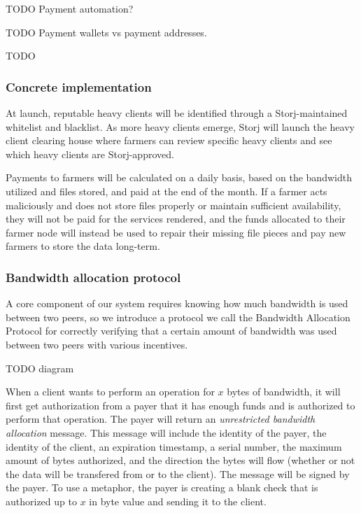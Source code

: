 \documentclass[a4paper,10pt]{article} \usepackage[utf8]{inputenc}
\newcommand{\todo}[1]{{\color{red} TODO #1 }}
\begin{document}
\todo{Payment automation?}

\todo{Payment wallets vs payment addresses. }

\todo{}

\subsubsection{Concrete implementation}

At launch, reputable heavy clients will be identified through a
Storj-maintained whitelist and blacklist. As more heavy clients emerge, Storj
will launch the heavy client clearing house where farmers can review specific
heavy clients and see which heavy clients are Storj-approved.

Payments to farmers will be calculated on a daily basis, based on the bandwidth
utilized and files stored, and paid at the end of the month. If a farmer acts
maliciously and does not store files properly or maintain sufficient
availability, they will not be paid for the services rendered, and the funds
allocated to their farmer node will instead be used to repair their missing
file pieces and pay new farmers to store the data long-term.

\subsubsection{Bandwidth allocation protocol}

A core component of our system requires knowing how much bandwidth is used
between two peers, so we introduce a protocol we call the Bandwidth Allocation
Protocol for correctly verifying that a certain amount of bandwidth was used
between two peers with various incentives.

\todo{diagram}

When a client wants to perform an operation for $x$ bytes of bandwidth, it will
first get authorization from a payer that it has enough funds and is authorized
to perform that operation. The payer will return an {\em unrestricted
bandwidth allocation} message. This message will include the identity of the
payer, the identity of the client, an expiration timestamp, a serial number,
the maximum amount of bytes authorized, and the direction the bytes will flow
(whether or not the data will be transfered from or to the client).
The message will be signed by the payer. To use a metaphor, the payer is
creating a blank check that is authorized up to $x$ in byte value and sending
it to the client.
\end{document}
